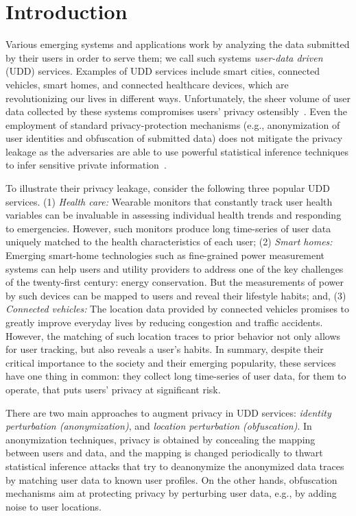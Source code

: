 \section{Introduction}
\label{intro}

Various emerging systems and applications work by analyzing
the data submitted by their users in order to serve them; we call such systems  \emph{user-data driven} (UDD)  services. Examples of UDD services include  smart cities, connected vehicles, smart homes, and connected healthcare devices, which are 
 revolutionizing our lives in different ways.  
Unfortunately, 	the sheer volume of user data collected by these systems 
compromises users' privacy ostensibly~\cite{FTC2015}. 
Even the employment of  standard 
privacy-protection mechanisms (e.g.,  anonymization of user identities and obfuscation of submitted data) does not mitigate the privacy leakage as the adversaries are able to use powerful statistical inference techniques to infer sensitive private information~\cite{FTC2015,0Quest2016, 2nia2016comprehensive, 3ukil2014iot, 4Hosseinzadeh2014,iotCastle,matching}.
 
To illustrate   their privacy leakage, consider the following three popular UDD services. 
(1) {\em Health care:}  Wearable monitors that constantly track user health variables can be invaluable in assessing individual health trends and responding to emergencies.  However, such monitors produce long time-series of user data uniquely matched to the health characteristics of each  user; (2) {\em Smart homes:}  Emerging smart-home technologies such as fine-grained power measurement systems can help users and utility providers to address one of the key challenges of the twenty-first century:  energy conservation.  But the measurements of power by such devices can be  mapped to users and reveal their lifestyle habits; and, (3) 
	{\em Connected vehicles:}  The location data provided by connected vehicles promises to greatly improve everyday lives by reducing congestion and traffic accidents.  However, the matching of such location traces to prior behavior not only allows for user tracking, but also reveals a user's habits.
In summary, despite their critical importance to the society and their emerging popularity, these services have one thing in common: 
they collect  long time-series of user data, for them to operate, 
that puts users' privacy at significant risk.

There are two main approaches to augment privacy in UDD services: 
 \emph{identity perturbation (anonymization)}, and \emph{location perturbation (obfuscation)}.  In anonymization techniques, privacy is obtained by concealing the mapping between users and data, and the mapping is changed periodically to  thwart statistical inference attacks that try to deanonymize the anonymized data traces by matching user data to 
 known  user profiles. 
 On the other hands,  obfuscation mechanisms aim at protecting privacy by perturbing user data, e.g., by adding noise to user locations. 


